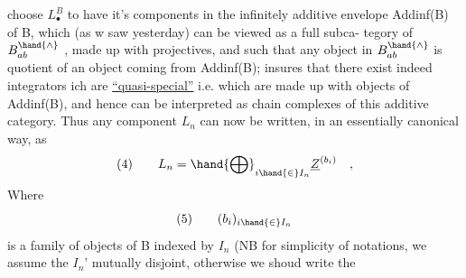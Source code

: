 choose $L^{B}_{\bullet}$ to have it's components in the infinitely additive envelope
Addinf(B) of B, which (as w saw yesterday) can be viewed as a full subca-%
tegory of $B^{\hand{\wedge}}_{ab}$ , made up with projectives, and such that any object in
$B^{\hand{\wedge}}_{ab}$ is quotient of an object coming from Addinf(B);   insures that
there exist indeed integrators ich are \uline{``quasi-special''} i.e. which are
made up with objects of Addinf(B), and hence can be interpreted as chain
complexes of this additive category. Thus any component $L_n$ can now be
written, in an essentially canonical way, as
\[ (4) \qquad L_n = \hand{\bigoplus}_{i\hand{\in} I_n} \underline{Z}^{(b_i)} \quad , \]
Where
\[ (5) \qquad (b_i)_{i\hand{\in} I_n} \]
is a family of objects of B indexed by $I_n$ (NB for simplicity of notations,
we assume the $I_n$' mutually disjoint, otherwise we shoud write the

